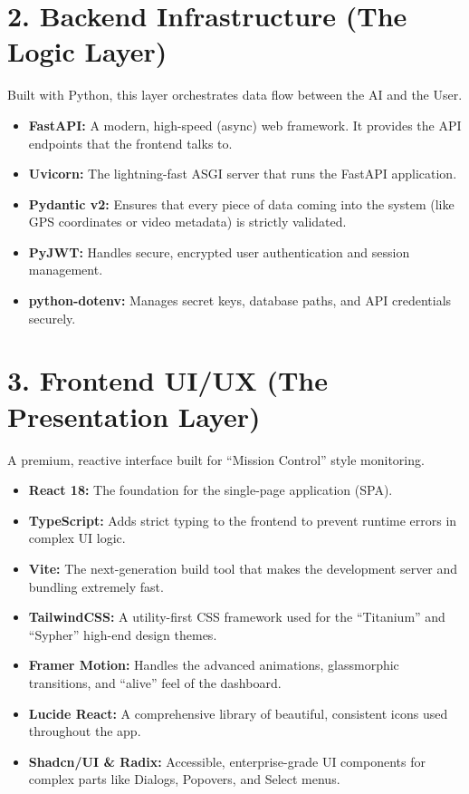 \documentclass[12pt,a4paper]{report}
\begin{document}
\section{2. Backend Infrastructure (The Logic Layer)}
Built with Python, this layer orchestrates data flow between the AI and the User.
\begin{itemize}
    \item \textbf{FastAPI:} A modern, high-speed (async) web framework. It provides the API endpoints that the frontend talks to.
    \item \textbf{Uvicorn:} The lightning-fast ASGI server that runs the FastAPI application.
    \item \textbf{Pydantic v2:} Ensures that every piece of data coming into the system (like GPS coordinates or video metadata) is strictly validated.
    \item \textbf{PyJWT:} Handles secure, encrypted user authentication and session management.
    \item \textbf{python-dotenv:} Manages secret keys, database paths, and API credentials securely.
\end{itemize}

\section{3. Frontend UI/UX (The Presentation Layer)}
A premium, reactive interface built for ``Mission Control'' style monitoring.
\begin{itemize}
    \item \textbf{React 18:} The foundation for the single-page application (SPA).
    \item \textbf{TypeScript:} Adds strict typing to the frontend to prevent runtime errors in complex UI logic.
    \item \textbf{Vite:} The next-generation build tool that makes the development server and bundling extremely fast.
    \item \textbf{TailwindCSS:} A utility-first CSS framework used for the ``Titanium'' and ``Sypher'' high-end design themes.
    \item \textbf{Framer Motion:} Handles the advanced animations, glassmorphic transitions, and ``alive'' feel of the dashboard.
    \item \textbf{Lucide React:} A comprehensive library of beautiful, consistent icons used throughout the app.
    \item \textbf{Shadcn/UI \& Radix:} Accessible, enterprise-grade UI components for complex parts like Dialogs, Popovers, and Select menus.
\end{itemize}
\end{document}
